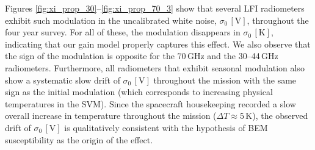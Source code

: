 \documentclass[twocolumn]{aa}
\begin{document}
Figures \ref{fig:xi_prop_30}--\ref{fig:xi_prop_70_3} show that
several LFI radiometers exhibit such modulation in the uncalibrated
white noise, $\sigma_0 \,\mathrm{[V]}$, throughout the four year survey. For all of
these, the modulation disappears in $\sigma_0 \,\mathrm{[K]}$, indicating that
our gain model properly captures this effect. We also observe that the
sign of the modulation is opposite for the 70\,GHz and the 30--44\,GHz
radiometers. Furthermore, all radiometers that exhibit seasonal
modulation also show a systematic slow drift of $\sigma_0 \,\mathrm{[V]}$
throughout the mission with the same sign as the initial modulation
(which corresponds to increasing physical temperatures in the
SVM). Since the spacecraft housekeeping recorded a slow overall
increase in temperature throughout the mission ($\Delta T \approx
5$\,K), the observed drift of $\sigma_0 \,\mathrm{[V]}$ is qualitatively consistent
with the hypothesis of BEM susceptibility as the origin of the effect.
\end{document}
